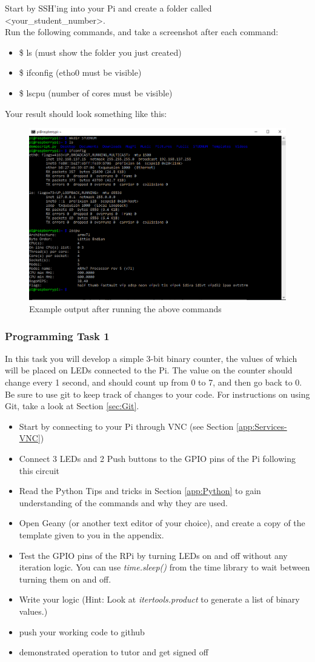 Start by SSH'ing into your Pi and create a folder called \textless your\_student\_number\textgreater.\\
Run the following commands, and take a screenshot after each command:
\begin{itemize}
    \item \$ ls (must show the folder you just created)
    \item \$ ifconfig (etho0 must be visible)
    \item \$ lscpu (number of cores must be visible)
\end{itemize}
Your result should look something like this:
\begin{figure}[H]
\centering
\includegraphics[width=0.6\columnwidth]{Figures/CMDOutput}
\caption{Example output after running the above commands}
\label{fig:CMDOutput}
\end{figure}



\subsubsection{Programming Task 1}
In this task you will develop a simple 3-bit binary counter, the values of which will be placed on LEDs connected to the Pi. The value on the counter should change every 1 second, and should count up from 0 to 7, and then go back to 0.
Be sure to use git to keep track of changes to your code. For instructions on using Git, take a look at Section \ref{sec:Git}.
\begin{itemize}
    \item Start by connecting to your Pi through VNC (see Section \ref{app:Services-VNC})
    \item Connect 3 LEDs and 2 Push buttons to the GPIO pins of the Pi following this circuit
    \item Read the Python Tips and tricks in Section \ref{app:Python} to gain understanding of the commands and why they are used.
    \item Open Geany (or another text editor of your choice), and create a copy of the template given to you in the appendix.
    \item Test the GPIO pins of the RPi by turning LEDs on and off without any iteration logic. You can use \textit{time.sleep()} from the time library to wait between turning them on and off.
    \item Write your logic (Hint: Look at \textit{itertools.product} to generate a list of binary values.)
    \item push your working code to github
    \item demonstrated operation to tutor and get signed off
\end{itemize}

